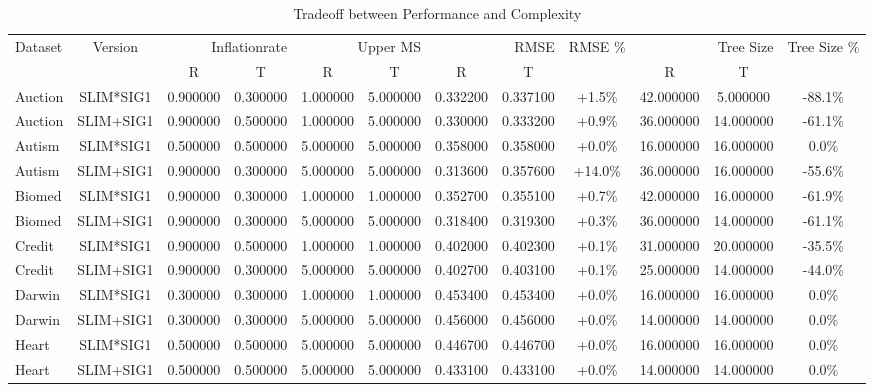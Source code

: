 
    \begin{table}[H]
        \centering
        \renewcommand{\arraystretch}{1.2}
        \caption{Tradeoff between Performance and Complexity}
        \label{tab:inflationrate_test_tradeoff}
    \begin{tabular}{lccccccccccc}
\toprule
Dataset & Version & \multicolumn{2}{r}{Inflationrate} & \multicolumn{2}{r}{Upper MS} & \multicolumn{2}{r}{RMSE} & RMSE \% & \multicolumn{2}{r}{Tree Size} & Tree Size \% \\
 &  &  R &  T &  R &  T &  R &  T &  &  R &  T &  \\
\midrule
Auction & SLIM*SIG1 & 0.900000 & 0.300000 & 1.000000 & 5.000000 & 0.332200 & 0.337100 & +1.5\% & 42.000000 & 5.000000 & -88.1\% \\
Auction & SLIM+SIG1 & 0.900000 & 0.500000 & 1.000000 & 5.000000 & 0.330000 & 0.333200 & +0.9\% & 36.000000 & 14.000000 & -61.1\% \\
Autism & SLIM*SIG1 & 0.500000 & 0.500000 & 5.000000 & 5.000000 & 0.358000 & 0.358000 & +0.0\% & 16.000000 & 16.000000 & 0.0\% \\
Autism & SLIM+SIG1 & 0.900000 & 0.300000 & 5.000000 & 5.000000 & 0.313600 & 0.357600 & +14.0\% & 36.000000 & 16.000000 & -55.6\% \\
Biomed & SLIM*SIG1 & 0.900000 & 0.300000 & 1.000000 & 1.000000 & 0.352700 & 0.355100 & +0.7\% & 42.000000 & 16.000000 & -61.9\% \\
Biomed & SLIM+SIG1 & 0.900000 & 0.300000 & 5.000000 & 5.000000 & 0.318400 & 0.319300 & +0.3\% & 36.000000 & 14.000000 & -61.1\% \\
Credit & SLIM*SIG1 & 0.900000 & 0.500000 & 1.000000 & 1.000000 & 0.402000 & 0.402300 & +0.1\% & 31.000000 & 20.000000 & -35.5\% \\
Credit & SLIM+SIG1 & 0.900000 & 0.300000 & 5.000000 & 5.000000 & 0.402700 & 0.403100 & +0.1\% & 25.000000 & 14.000000 & -44.0\% \\
Darwin & SLIM*SIG1 & 0.300000 & 0.300000 & 1.000000 & 1.000000 & 0.453400 & 0.453400 & +0.0\% & 16.000000 & 16.000000 & 0.0\% \\
Darwin & SLIM+SIG1 & 0.300000 & 0.300000 & 5.000000 & 5.000000 & 0.456000 & 0.456000 & +0.0\% & 14.000000 & 14.000000 & 0.0\% \\
Heart & SLIM*SIG1 & 0.500000 & 0.500000 & 5.000000 & 5.000000 & 0.446700 & 0.446700 & +0.0\% & 16.000000 & 16.000000 & 0.0\% \\
Heart & SLIM+SIG1 & 0.500000 & 0.500000 & 5.000000 & 5.000000 & 0.433100 & 0.433100 & +0.0\% & 14.000000 & 14.000000 & 0.0\% \\

\end{tabular}
\end{table}
